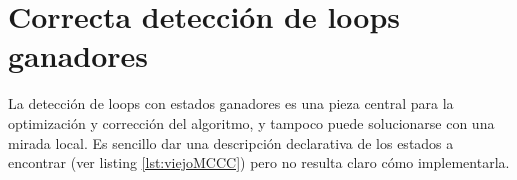

% 
% 
% 


\section{Correcta detección de loops ganadores}

La detección de loops con estados ganadores es una pieza central para la optimización y corrección del algoritmo, y tampoco puede solucionarse con una mirada local. Es sencillo dar una descripción declarativa de los estados a encontrar (ver listing \ref{lst:viejoMCCC}) pero no resulta claro cómo implementarla. 

